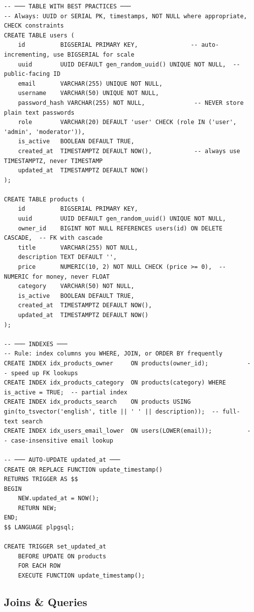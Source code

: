\documentclass[10pt, a4paper]{article}
\begin{document}
\begin{lstlisting}[language=mysql]
-- ─── TABLE WITH BEST PRACTICES ───
-- Always: UUID or SERIAL PK, timestamps, NOT NULL where appropriate, CHECK constraints
CREATE TABLE users (
    id          BIGSERIAL PRIMARY KEY,               -- auto-incrementing, use BIGSERIAL for scale
    uuid        UUID DEFAULT gen_random_uuid() UNIQUE NOT NULL,  -- public-facing ID
    email       VARCHAR(255) UNIQUE NOT NULL,
    username    VARCHAR(50) UNIQUE NOT NULL,
    password_hash VARCHAR(255) NOT NULL,              -- NEVER store plain text passwords
    role        VARCHAR(20) DEFAULT 'user' CHECK (role IN ('user', 'admin', 'moderator')),
    is_active   BOOLEAN DEFAULT TRUE,
    created_at  TIMESTAMPTZ DEFAULT NOW(),            -- always use TIMESTAMPTZ, never TIMESTAMP
    updated_at  TIMESTAMPTZ DEFAULT NOW()
);

CREATE TABLE products (
    id          BIGSERIAL PRIMARY KEY,
    uuid        UUID DEFAULT gen_random_uuid() UNIQUE NOT NULL,
    owner_id    BIGINT NOT NULL REFERENCES users(id) ON DELETE CASCADE,  -- FK with cascade
    title       VARCHAR(255) NOT NULL,
    description TEXT DEFAULT '',
    price       NUMERIC(10, 2) NOT NULL CHECK (price >= 0),  -- NUMERIC for money, never FLOAT
    category    VARCHAR(50) NOT NULL,
    is_active   BOOLEAN DEFAULT TRUE,
    created_at  TIMESTAMPTZ DEFAULT NOW(),
    updated_at  TIMESTAMPTZ DEFAULT NOW()
);

-- ─── INDEXES ───
-- Rule: index columns you WHERE, JOIN, or ORDER BY frequently
CREATE INDEX idx_products_owner     ON products(owner_id);           -- speed up FK lookups
CREATE INDEX idx_products_category  ON products(category) WHERE is_active = TRUE;  -- partial index
CREATE INDEX idx_products_search    ON products USING gin(to_tsvector('english', title || ' ' || description));  -- full-text search
CREATE INDEX idx_users_email_lower  ON users(LOWER(email));          -- case-insensitive email lookup

-- ─── AUTO-UPDATE updated_at ───
CREATE OR REPLACE FUNCTION update_timestamp()
RETURNS TRIGGER AS $$
BEGIN
    NEW.updated_at = NOW();
    RETURN NEW;
END;
$$ LANGUAGE plpgsql;

CREATE TRIGGER set_updated_at
    BEFORE UPDATE ON products
    FOR EACH ROW
    EXECUTE FUNCTION update_timestamp();
\end{lstlisting}


\subsection{Joins \& Queries}
\end{document}
